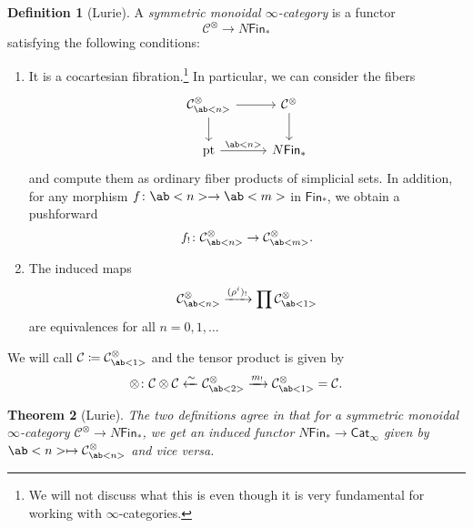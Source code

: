 \documentclass[10pt, oneside]{memoir}
\newtheorem{thm}{Theorem}[subsection]
\theoremstyle{definition}
\newtheorem{defn}[thm]{Definition}
\theoremstyle{remark}
\theoremstyle{plain}
\theoremstyle{definition}
\theoremstyle{remark}
\newcommand{\mc}[1]{\mathcal{#1}}
\newcommand{\mr}[1]{\mathrm{#1}}
\newcommand{\ms}[1]{\mathsf{#1}}
\newcommand{\1}{\mathbf{1}}
\newcommand{\2}{\mathbf{2}}
\newcommand{\3}{\mathbf{3}}
\newcommand{\pt}{\mr{pt}}
\begin{document}
\begin{defn}[Lurie]
    A \textit{symmetric monoidal $\infty$-category} is a functor 
    \[ \mc{C}^{\otimes} \to N\ms{Fin}_* \]
    satisfying the following conditions:
    \begin{enumerate}
        \item It is a cocartesian fibration.\footnote{We will not discuss what this is even though it is very fundamental for working with $\infty$-categories.} In particular, we can consider the fibers
        \begin{equation*}
        \begin{tikzcd}
            \mc{C}_{\ab<n>}^{\otimes} \ar{r} \ar{d} & \mc{C}^{\otimes} \ar{d} \\
            \pt \ar{r}{\ab<n>} & N\ms{Fin}_*
        \end{tikzcd}
        \end{equation*}
        and compute them as ordinary fiber products of simplicial sets. In addition, for any morphism $f \colon \ab<n> \to \ab<m>$ in $\ms{Fin}_*$, we obtain a pushforward
        \[ f_! \colon \mc{C}^{\otimes}_{\ab<n>} \to \mc{C}^{\otimes}_{\ab<m>}. \]
        \item The induced maps
        \[ \mc{C}^{\otimes}_{\ab<n>} \xrightarrow{(\rho^i)_!} \prod \mc{C}_{\ab<1>}^{\otimes} \]
        are equivalences for all $n = 0, 1, \ldots$
    \end{enumerate}
\end{defn}

We will call $\mc{C} \coloneqq \mc{C}_{\ab<1>}^{\otimes}$ and the tensor product is given by
\[ \otimes \colon \mc{C} \otimes \mc{C} \xleftarrow{\sim} \mc{C}_{\ab<2>}^{\otimes} \xrightarrow{m_!} \mc{C}_{\ab<1>}^{\otimes} = \mc{C}. \]

\begin{thm}[Lurie]
    The two definitions agree in that for a symmetric monoidal $\infty$-category $\mc{C}^{\otimes} \to N\ms{Fin}_*$, we get an induced functor $N\ms{Fin}_* \to \ms{Cat}_{\infty}$ given by $\ab<n> \mapsto \mc{C}_{\ab<n>}^{\otimes}$ and vice versa.
\end{thm}
\end{document}
